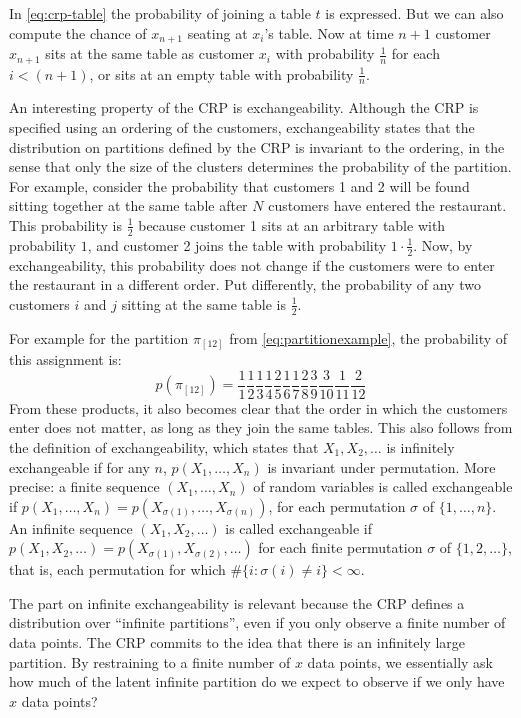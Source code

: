In \cref{eq:crp-table} the probability of joining a table $t$ is expressed. But we can also compute the chance of $x_{n+1}$ seating at $x_i$'s table. Now at time $n+1$ customer $x_{n+1}$ sits at the same table as customer $x_i$ with probability $\frac{1}{n}$ for each $i<(n+1)$, or sits at an empty table with probability $\frac{1}{n}$. 

An interesting property of the CRP is exchangeability. Although the CRP is specified using an ordering of the customers, exchangeability states that the distribution on partitions defined by the CRP is invariant to the ordering, in the sense that only the size of the clusters determines the probability of the partition. For example, consider the probability that customers 1 and 2 will be found sitting together at the same table after $N$ customers have entered the restaurant. This probability is $\frac{1}{2}$ because customer 1 sits at an arbitrary table with probability $1$, and customer 2 joins the table with probability $1\cdot\frac{1}{2}$. Now, by exchangeability, this probability does not change if the customers were to enter the restaurant in a different order. Put differently, the probability of any two customers $i$ and $j$ sitting at the same table is $\frac{1}{2}$.

For example for the partition $\pi_{[12]}$ from \cref{eq:partitionexample}, the probability of this assignment is:
\begin{equation}\label{eq:partitionexampleprobability}
	p(\pi_{[12]}) = \frac{1}{1}\frac{1}{2}\frac{1}{3}\frac{1}{4}\frac{2}{5}\frac{1}{6}\frac{1}{7}\frac{2}{8}\frac{3}{9}\frac{3}{10}\frac{1}{11}\frac{2}{12}
\end{equation}
From these products, it also becomes clear that the order in which the customers enter does not matter, as long as they join the same tables. This also follows from the definition of exchangeability, which states that $X_1, X_2, \ldots$ is infinitely exchangeable if for any $n$, $p(X_1,\ldots,X_n)$ is invariant under permutation. More precise: a finite sequence $(X_1, \ldots, X_n)$ of random variables is called exchangeable if $p(X_1,\ldots,X_n) = p(X_{\sigma(1)},\ldots,X_{\sigma(n)})$, for each permutation $\sigma$ of $\{1,\ldots,n\}$. An infinite sequence $(X_1,X_2,\ldots)$ is called exchangeable if $p(X_1,X_2,\ldots)=p(X_{\sigma(1)},X_{\sigma(2)},\ldots)$ for each finite permutation $\sigma$ of $\{1,2,\ldots\}$, that is, each permutation for which $\#\{i: \sigma(i)\neq i\} < \infty$.

The part on infinite exchangeability is relevant because the CRP defines a distribution over ``infinite partitions'', even if you only observe a finite number of data points. The CRP commits to the idea that there is an infinitely large partition. By restraining to a finite number of $x$ data points, we essentially ask how much of the latent infinite partition do we expect to observe if we only have $x$ data points?

